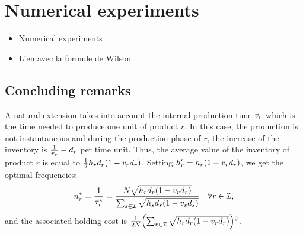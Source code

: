 \section{Numerical experiments}

\begin{itemize}
  \item Numerical experiments
  \item Lien avec la formule de Wilson
\end{itemize}


\subsection{Concluding remarks}



A natural extension takes into account the internal production time $v_r$ which is the time needed to produce one unit of product $r$. In this case, the production is not instantaneous and during the production phase of $r$, the increase of the inventory is $\frac{1}{v_r}-d_r$ per time unit. Thus, the average value of the inventory of product $r$ is equal to $\frac{1}{2}\holding_r\demand_r\bracket{1-\internal_r\demand_r}$. Setting $\holding_r'=\holding_r\bracket{1-\internal_r\demand_r}$, we get the optimal frequencies:
\begin{equation}
  \freq_r^* = \frac{1}{\cover_r^*}
            = \frac{\nbsetups\sqrt{\holding_r\demand_r\bracket{1-\internal_r\demand_r}}}{\sum_{s\in\REF}\sqrt{\holding_s\demand_s\bracket{1-\internal_s\demand_s}}}
            \quad \forall r\in\REF,
\end{equation}
and the associated holding cost is $\frac{1}{2\nbsetups}\bracket{\sum_{r\in\REF}\sqrt{\holding_r\demand_r\bracket{1-\internal_r\demand_r}}}^2$.

